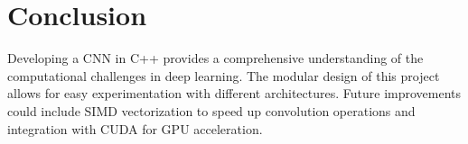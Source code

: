 \documentclass[11pt, a4paper]{article}
\begin{document}
\section{Conclusion}
Developing a CNN in C++ provides a comprehensive understanding of the computational challenges in deep learning. The modular design of this project allows for easy experimentation with different architectures. Future improvements could include SIMD vectorization to speed up convolution operations and integration with CUDA for GPU acceleration.
\end{document}

